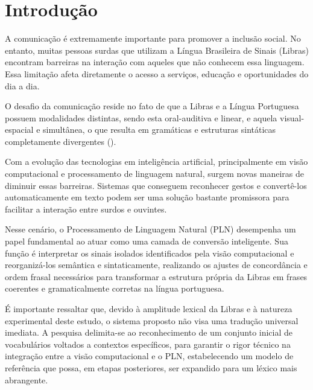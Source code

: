 \documentclass[
    12pt,                %
    openright,           %
    oneside,             %
    a4paper,             %
    english,             %
    brazil               %
]{abntex2}
\begin{document}
\textual

\chapter{Introdução}
\label{cap:introducao}

A comunicação é extremamente importante para promover a inclusão social. No entanto, muitas pessoas surdas que utilizam a Língua Brasileira de Sinais (Libras) encontram barreiras na interação com aqueles que não conhecem essa linguagem. Essa limitação afeta diretamente o acesso a serviços, educação e oportunidades do dia a dia. 

O desafio da comunicação reside no fato de que a Libras e a Língua Portuguesa possuem modalidades distintas, sendo esta oral-auditiva e linear, e aquela visual-espacial e simultânea, o que resulta em gramáticas e estruturas sintáticas completamente divergentes (\cite{Olizaroski2024}).

Com a evolução das tecnologias em inteligência artificial, principalmente em visão computacional e processamento de linguagem natural, surgem novas maneiras de diminuir essas barreiras. Sistemas que conseguem reconhecer gestos e convertê-los automaticamente em texto podem ser uma solução bastante promissora para facilitar a interação entre surdos e ouvintes. 

Nesse cenário, o Processamento de Linguagem Natural (PLN) desempenha um papel fundamental ao atuar como uma camada de conversão inteligente. Sua função é interpretar os sinais isolados identificados pela visão computacional e reorganizá-los semântica e sintaticamente, realizando os ajustes de concordância e ordem frasal necessários para transformar a estrutura própria da Libras em frases coerentes e gramaticalmente corretas na língua portuguesa.

É importante ressaltar que, devido à amplitude lexical da Libras e à natureza experimental deste estudo, o sistema proposto não visa uma tradução universal imediata. A pesquisa delimita-se ao reconhecimento de um conjunto inicial de vocabulários voltados a contextos específicos, para garantir o rigor técnico na integração entre a visão computacional e o PLN, estabelecendo um modelo de referência que possa, em etapas posteriores, ser expandido para um léxico mais abrangente.
\end{document}
